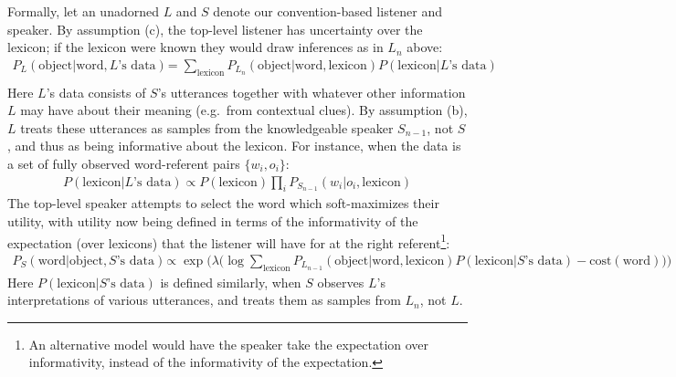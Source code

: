 \documentclass{article} %
\newcommand{\word}{\text{word}}
\newcommand{\obj}{\text{object}}
\newcommand{\lex}{\text{lexicon}}
\newcommand{\prior}{P_{\text{prior}}(\obj)}
\begin{document}
Formally, let an unadorned $L$ and $S$ denote our convention-based
listener and speaker. By assumption (c), the top-level listener has uncertainty over the lexicon; if the lexicon were known they would draw inferences as in $L_n$ above:
%
\begin{align*}
  P_L(\obj | \word, \text{$L$'s data}) &=  \sum_\lex P_{L_n}(\obj | \word, \lex) P(\lex | \text{$L$'s data}) \\
\end{align*}
Here $L$'s data consists of $S$'s utterances together with whatever
other information $L$ may have about their meaning (e.g.~from
contextual clues). 
By assumption (b), $L$ treats these  utterances
as samples from the knowledgeable speaker $S_{n-1}$, not $S$, and thus
as being informative about the lexicon. For instance, when the data is a set of fully observed 
word-referent pairs $\{w_i, o_i\}$:
\begin{align*}
  P(\lex | \text{$L$'s data}) \propto P(\lex) \prod_i P_{S_{n-1}}(w_i|o_i,  \lex)
\end{align*}
The top-level speaker attempts to select the word which soft-maximizes their utility, with utility now being defined in terms of the informativity of the expectation (over lexicons) that the listener will have for at the right referent\footnote{An alternative model would have the speaker take the expectation over informativity, instead of the informativity of the expectation.}:
\begin{align*}
  P_S(\word | \obj, \text{$S$'s data}) &\propto \exp\Big(\lambda \big(\log  \sum_\lex P_{L_{n-1}}(\obj | \word, \lex) P(\lex|\text{$S$'s data}) - \text{cost}(\word)\big)\Big)
\end{align*}
Here $P(\lex|\text{$S$'s data})$ is defined similarly, when $S$ observes
$L$'s interpretations of various utterances, and treats them as
samples from $L_n$, not $L$.

\end{document}
